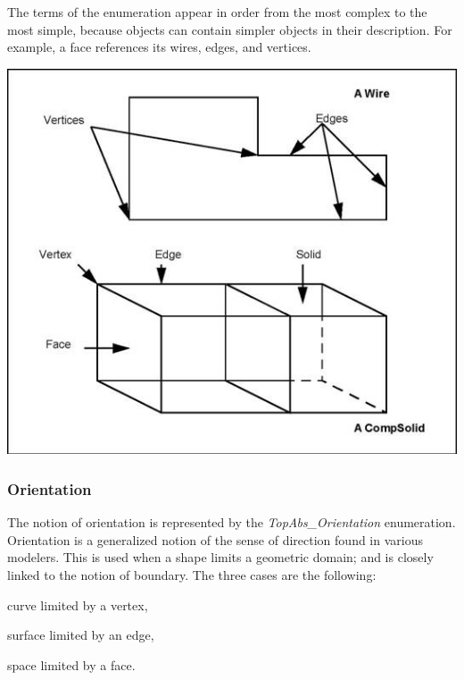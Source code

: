 The terms of the enumeration appear in order from the most complex to the most simple, because objects can contain simpler objects in their description. For example, a face references its wires, edges, and vertices. 
\begin{DoxyImage}
\begin{center}
 \includegraphics[width=\textwidth,height=\textheight/2,keepaspectratio=true]{modeling_data_image006.png}
\end{center}
\caption{Shape\+Enum}
\end{DoxyImage}
 \hypertarget{occt_user_guides__modeling_data_occt_modat_5_2_2}{}\subsubsection{Orientation}\label{occt_user_guides__modeling_data_occt_modat_5_2_2}
The notion of orientation is represented by the {\itshape Top\+Abs\+\_\+\+Orientation} enumeration. Orientation is a generalized notion of the sense of direction found in various modelers. This is used when a shape limits a geometric domain; and is closely linked to the notion of boundary. The three cases are the following\+:
\begin{DoxyItemize}
\item curve limited by a vertex,
\item surface limited by an edge,
\item space limited by a face.
\end{DoxyItemize}

